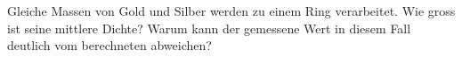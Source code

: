 Gleiche Massen von Gold und Silber werden zu einem Ring verarbeitet. Wie gross ist seine mittlere Dichte? Warum kann der gemessene Wert in diesem Fall deutlich vom berechneten abweichen?
